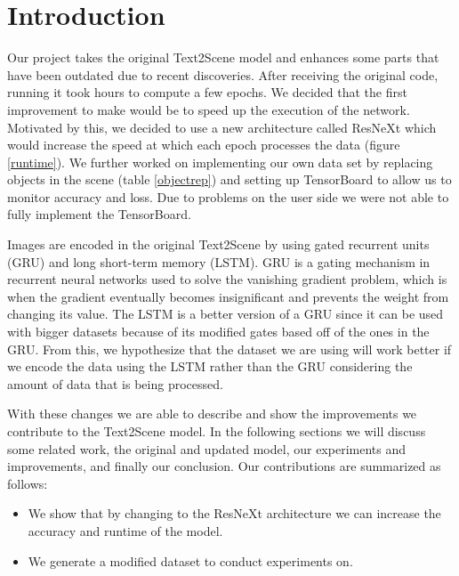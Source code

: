 \documentclass[10pt,twocolumn,letterpaper]{article}
\begin{document}
\section{Introduction}
Our project takes the original Text2Scene model and enhances some parts that have been outdated due to recent discoveries. After receiving the original code, running it took hours to compute a few epochs. We decided that the first improvement to make would be to speed up the execution of the network. Motivated by this, we decided to use a new architecture called ResNeXt which would increase the speed at which each epoch processes the data (figure \ref{runtime}). We further worked on implementing our own data set by replacing objects in the scene (table \ref{objectrep}) and setting up TensorBoard to allow us to monitor accuracy and loss. Due to problems on the user side we were not able to fully implement the TensorBoard.\par
Images are encoded in the original Text2Scene by using gated recurrent units (GRU) and long short-term memory (LSTM). GRU is a gating mechanism in recurrent neural networks used to solve the vanishing gradient problem, which is when the gradient eventually becomes insignificant and prevents the weight from changing its value. The LSTM is a better version of a GRU since it can be used with bigger datasets because of its modified gates based off of the ones in the GRU. From this, we hypothesize that the dataset we are using will work better if we encode the data using the LSTM rather than the GRU considering the amount of data that is being processed.\par
With these changes we are able to describe and show the improvements we contribute to the Text2Scene model. In the following sections we will discuss some related work, the original and updated model, our experiments and improvements, and finally our conclusion.
Our contributions are summarized as follows:
\begin{itemize}
 \item We show that by changing to the ResNeXt architecture we can increase the accuracy and runtime of the model.
 \item We generate a modified dataset to conduct experiments on.
\end{itemize}
\end{document}
